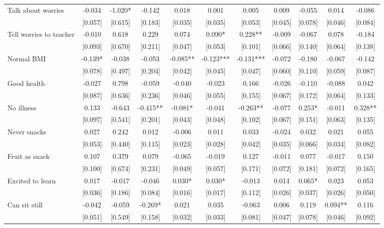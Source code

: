 \documentclass[12pt]{article}
\begin{document}
\begin{table}[ht]
\begin{center}
\begin{adjustbox}{width=1.2\textwidth,center=\textwidth}
\begin{tabular}{l*{10}{c}}
Talk about worries  & -0.034 & -1.020* & -0.142 & 0.018 & 0.001 & 0.005 & 0.009 & -0.055 & 0.014 & -0.086 \\
 & [0.057] & [0.615] & [0.183] & [0.035] & [0.035] & [0.053] & [0.045] & [0.078] & [0.046] & [0.084] \\
Tell worries to teacher & -0.010 & 0.618 & 0.229 & 0.074 & 0.090* & 0.228** & -0.009 & -0.067 & 0.078 & -0.184 \\
 & [0.093] & [0.670] & [0.211] & [0.047] & [0.053] & [0.101] & [0.066] & [0.140] & [0.064] & [0.138] \\
Normal BMI & -0.139* & -0.038 & -0.053 & -0.085** & -0.123*** & -0.131*** & -0.072 & -0.180 & -0.067 & -0.142 \\
 & [0.078] & [0.497] & [0.204] & [0.042] & [0.045] & [0.047] & [0.060] & [0.110] & [0.059] & [0.087] \\
Good health & -0.027 & 0.798 & -0.059 & -0.040 & -0.023 & 0.166 & -0.026 & -0.110 & -0.088 & 0.042 \\
 & [0.087] & [0.636] & [0.236] & [0.046] & [0.055] & [0.155] & [0.067] & [0.172] & [0.064] & [0.133] \\
No illness & 0.133 & -0.643 & -0.415** & -0.081* & -0.041 & -0.263** & -0.077 & 0.253* & -0.011 & 0.328** \\
 & [0.097] & [0.541] & [0.201] & [0.043] & [0.048] & [0.102] & [0.067] & [0.151] & [0.063] & [0.135] \\
Never snacks & 0.027 & 0.242 & 0.012 & -0.006 & 0.011 & 0.033 & -0.024 & 0.032 & 0.021 & 0.055 \\
 & [0.053] & [0.440] & [0.115] & [0.023] & [0.028] & [0.042] & [0.035] & [0.066] & [0.034] & [0.082] \\
Fruit as snack & 0.107 & 0.379 & 0.079 & -0.065 & -0.019 & 0.127 & -0.011 & 0.077 & -0.017 & 0.150 \\
 & [0.100] & [0.674] & [0.231] & [0.049] & [0.057] & [0.171] & [0.072] & [0.181] & [0.072] & [0.165] \\
Excited to learn & 0.017 & -0.017 & -0.046 & 0.030* & 0.030* & -0.013 & 0.014 & 0.065* & 0.023 & 0.053 \\
 & [0.036] & [0.186] & [0.084] & [0.016] & [0.017] & [0.112] & [0.026] & [0.037] & [0.026] & [0.050] \\
Can sit still & -0.042 & -0.059 & -0.269* & 0.021 & 0.035 & -0.063 & 0.006 & 0.119 & 0.094** & 0.116 \\
 & [0.051] & [0.549] & [0.158] & [0.032] & [0.033] & [0.081] & [0.047] & [0.078] & [0.046] & [0.092] \\

\end{tabular}
\end{adjustbox}
\end{center}
\end{table}
\end{document}
